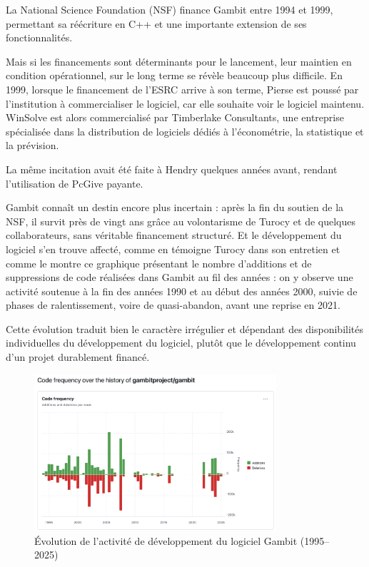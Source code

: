La National Science Foundation (NSF) finance Gambit entre 1994 et 1999, permettant sa réécriture en C++ et une importante extension de ses fonctionnalités.

Mais si les financements sont déterminants pour le lancement, leur maintien en condition opérationnel, sur le long terme se révèle beaucoup plus difficile. En 1999, lorsque le financement de l’ESRC arrive à son terme, Pierse est poussé par l'institution à commercialiser le logiciel, car elle souhaite voir le logiciel maintenu. WinSolve est alors commercialisé par Timberlake Consultants, une entreprise spécialisée dans la distribution de logiciels dédiés à l'économétrie, la statistique et la prévision. 

La même incitation avait été faite à Hendry quelques années avant, rendant l'utilisation de PcGive payante. 

Gambit connaît un destin encore plus incertain : après la fin du soutien de la NSF, il survit près de vingt ans grâce au volontarisme de Turocy et de quelques collaborateurs, sans véritable financement structuré.  Et le développement du logiciel s’en trouve affecté, comme en témoigne Turocy dans son entretien et comme le montre ce graphique présentant le nombre d’additions et de suppressions de code réalisées dans Gambit au fil des années : on y observe une activité soutenue à la fin des années 1990 et au début des années 2000, suivie de phases de ralentissement, voire de quasi-abandon, avant une reprise en 2021. 

Cette évolution traduit bien le caractère irrégulier et dépendant des disponibilités individuelles du développement du logiciel, plutôt que le développement continu d’un projet durablement financé.

\begin{figure}[h]
  \centering
  \includegraphics[width=0.8\textwidth]{figures/code_frequency_Gambit.png}
  \caption{Évolution de l’activité de développement du logiciel Gambit (1995–2025)}
  \label{fig:graph_commits_Gambit}
\end{figure}

